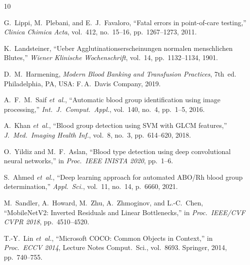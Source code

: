 \documentclass[conference]{IEEEtran}
\begin{document}
\begin{thebibliography}{10}

G.~Lippi, M.~Plebani, and E.~J.~Favaloro,
``Fatal errors in point-of-care testing,''
\emph{Clinica Chimica Acta}, vol.~412, no.~15--16,
pp.~1267--1273, 2011.

K.~Landsteiner,
``Ueber Agglutinationserscheinungen normalen menschlichen Blutes,''
\emph{Wiener Klinische Wochenschrift}, vol.~14,
pp.~1132--1134, 1901.

D.~M.~Harmening,
\emph{Modern Blood Banking and Transfusion Practices},
7th~ed. Philadelphia, PA, USA: F.\,A.~Davis Company, 2019.

A.~F.~M.~Saif \emph{et~al.},
``Automatic blood group identification using image processing,''
\emph{Int.\ J.\ Comput.\ Appl.}, vol.~140, no.~4,
pp.~1--5, 2016.

A.~Khan \emph{et~al.},
``Blood group detection using SVM with GLCM features,''
\emph{J.\ Med.\ Imaging Health Inf.}, vol.~8, no.~3,
pp.~614--620, 2018.

O.~Yildiz and M.~F.~Aslan,
``Blood type detection using deep convolutional neural networks,''
in \emph{Proc.\ IEEE INISTA 2020}, pp.~1--6.

S.~Ahmed \emph{et~al.},
``Deep learning approach for automated ABO/Rh blood group
determination,''
\emph{Appl.\ Sci.}, vol.~11, no.~14, p.~6660, 2021.

M.~Sandler, A.~Howard, M.~Zhu, A.~Zhmoginov, and L.-C.~Chen,
``MobileNetV2: Inverted Residuals and Linear Bottlenecks,''
in \emph{Proc.\ IEEE/CVF CVPR 2018}, pp.~4510--4520.

T.-Y.~Lin \emph{et~al.},
``Microsoft COCO: Common Objects in Context,''
in \emph{Proc.\ ECCV 2014}, Lecture Notes Comput.\ Sci.,
vol.~8693. Springer, 2014, pp.~740--755.

\end{thebibliography}
\end{document}
